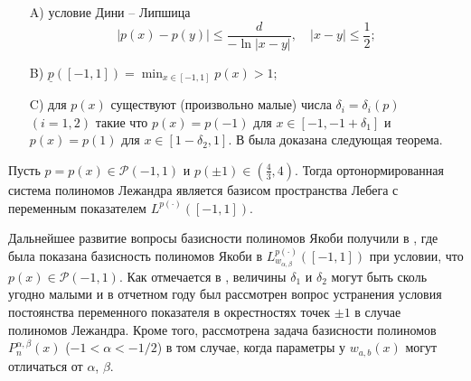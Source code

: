 \begin{enumerate}
  \item[A)]  условие Дини -- Липшица
  \begin{equation}\label{tad-DiniLipCond}
    |p(x)-p(y)|\le \frac{d}{-\ln|x-y|}, \quad |x-y|\le\frac12;
  \end{equation}
  
  \item[B)]   $\underline{p}([-1,1])=\min_{x\in [-1,1]}p(x)>1$;
  
  \item[C)] для $p(x)$ существуют (произвольно малые) числа $\delta_i=\delta_i(p)$ $(i=1,2)$ такие что $p(x)=p(-1)$ для $x\in[-1,-1+\delta_1]$ и $p(x)=p(1)$ для $x\in [1-\delta_2,1]$.
  В \cite{tad-SHII-Leg} была доказана следующая теорема.
\end{enumerate}
\begin{theoremA}\label{ShII-Th}
	Пусть $p=p(x)\in\mathcal{P}(-1,1)$  и $p(\pm1)\in(\frac43,4)$. Тогда ортонормированная система полиномов Лежандра является базисом пространства Лебега с переменным показателем $L^{p(\cdot)}([-1,1])$.
\end{theoremA}
Дальнейшее развитие вопросы  базисности полиномов Якоби получили в \cite{tad-SHII-Jacob,tad-SHII-Ult,tad-RAM-Jacob}, где была показана базисность полиномов Якоби в $L^{p(\cdot)}_{w_{\alpha,\beta}}([-1,1])$ при условии, что \linebreak$p(x)\in\mathcal{P}(-1,1)$.  Как отмечается в \cite{tad-SHII-Leg}, величины $\delta_1$ и $\delta_2$ могут быть сколь угодно малыми и в отчетном году был рассмотрен вопрос устранения условия постоянства переменного показателя в окрестностях точек $\pm1$ в случае полиномов Лежандра. Кроме того, рассмотрена задача базисности полиномов $P_n^{\alpha,\beta}(x)$ ($-1<\alpha<-1/2$) в том случае, когда параметры у $w_{a,b}(x)$ могут отличаться от $\alpha$, $\beta$.

